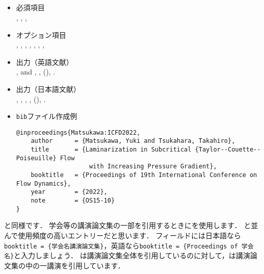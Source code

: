 \documentclass[a4paper,fleqn,uplatex,dvipdfmx]{jsarticle}
\begin{document}
\subsection{\ttinproceedings}
\label{ssec:inproceedings}
\begin{screen}
    \begin{itemize}
        \item 必須項目 \\
        \ttauthor, \tttitle, \ttbooktitle, \ttyear
        \item オプション項目 \\
        \tteditor, \ttpages, \ttorganization, \ttpublisher, \ttaddress, \ttmonth, \ttnote, \ttkey
        \item 出力（英語文献） \\
            \colorbox[gray]{0.8}{\ttauthorf}, \colorbox[gray]{0.8}{\ttauthors} and \colorbox[gray]{0.8}{\ttauthort}, \colorbox[gray]{0.8}{\tttitle}, \colorbox[gray]{0.8}{\ttbooktitle} (\colorbox[gray]{0.8}{\ttyear}), \colorbox[gray]{0.8}{\ttnote}.
        \item 出力（日本語文献） \\
            \colorbox[gray]{0.8}{\ttauthorf}, \colorbox[gray]{0.8}{\ttauthors}, \colorbox[gray]{0.8}{\ttauthort}, \colorbox[gray]{0.8}{\tttitle}, \colorbox[gray]{0.8}{\ttbooktitle} (\colorbox[gray]{0.8}{\ttyear}), \colorbox[gray]{0.8}{\ttnote}.
        \item \verb|bib|ファイル作成例 \vspace{-3mm}
\begin{verbatim}
@inproceedings{Matsukawa:ICFD2022,
    author      = {Matsukawa, Yuki and Tsukahara, Takahiro},
    title       = {Laminarization in Subcritical {Taylor--Couette--Poiseuille} Flow 
                    with Increasing Pressure Gradient},
    booktitle   = {Proceedings of 19th International Conference on Flow Dynamics},
    year        = {2022},
    note        = {OS15-10}
}
\end{verbatim}
    \end{itemize}
\end{screen}

\hyperref[ssec:conference]{\ttconference}と同様です．
学会等の講演論文集の一部を引用するときに\ttinproceedings を使用します．
\hyperref[ssec:article]{\ttarticle}と並んで使用頻度の高いエントリーだと思います．
\ttbooktitle フィールドには日本語なら\texttt{booktitle = \{\colorbox[gray]{0.8}{学会名}講演論文集\}}，英語なら\texttt{booktitle = \{Proceedings of \colorbox[gray]{0.8}{学会名}\}}と入力しましょう．
\hyperref[ssec:proceedings]{\ttproceedings}は講演論文集全体を引用しているのに対して，\ttinproceedings は講演論文集の中の一講演を引用しています．
\end{document}
